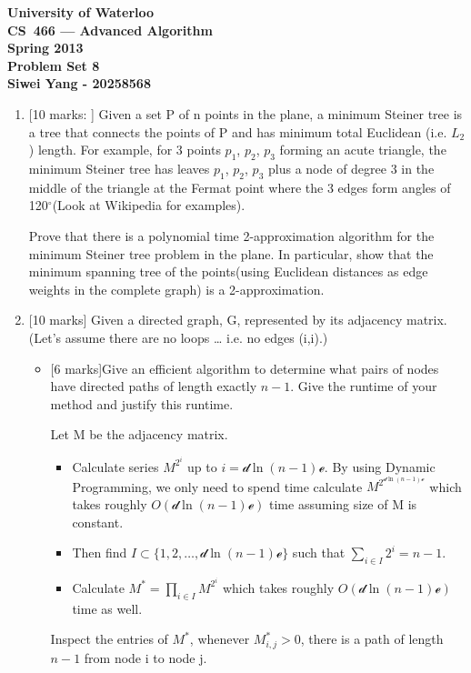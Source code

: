\documentclass[12pt]{article}
\begin{document}
\begin{center}
\large\bf University of Waterloo\\
CS~466 --- Advanced Algorithm\\
Spring 2013\\
Problem Set 8\\
Siwei Yang - 20258568\\
\end{center}
\bigskip

\begin{enumerate}

\item{} [10 marks: ]
Given a set P of n points in the plane, a minimum Steiner tree is a tree that connects the points of P and has minimum total Euclidean (i.e. $L_{2}$) length. For example, for 3 points $p_{1}$, $p_{2}$, $p_{3}$ forming an acute triangle, the minimum Steiner tree has leaves $p_{1}$, $p_{2}$, $p_{3}$ plus a node of degree 3 in the middle of the triangle at the Fermat point where the 3 edges form angles of 120$^\circ$(Look at Wikipedia for examples).

Prove that there is a polynomial time 2-approximation algorithm for the minimum Steiner tree problem in the plane. In particular, show that the minimum spanning tree of the points(using Euclidean distances as edge weights in the complete graph) is a 2-approximation.



\item{} [10 marks]
Given a directed graph, G, represented by its adjacency matrix. (Let’s assume there are no loops … i.e. no edges (i,i).)
\begin{itemize}
\item{}[6 marks]Give an efficient algorithm to determine what pairs of nodes have directed paths of length exactly $n-1$. Give the runtime of your method and justify this runtime.

Let M be the adjacency matrix.
\begin{itemize}
\item Calculate series $M^{2^{i}}$ up to $i = \mathcal{d} \ln{(n-1)} \mathcal{e}$. By using Dynamic Programming, we only need to spend time calculate $M^{2^{\mathcal{d} \ln{(n-1)} \mathcal{e}}}$ which takes roughly $O(\mathcal{d} \ln{(n-1)} \mathcal{e})$ time assuming size of M is constant.
\item Then find $I \subset \{1, 2, \ldots, \mathcal{d} \ln{(n-1)} \mathcal{e}\}$ such that $\sum_{i \in I}{2^{i}} = n-1$.
\item Calculate $M^{*} = \prod_{i \in I}{M^{2^{i}}}$ which takes roughly $O(\mathcal{d} \ln{(n-1)} \mathcal{e})$ time as well.
\end{itemize}
 Inspect the entries of $M^{*}$, whenever $M^{*}_{i,j} > 0$, there is a path of length $n-1$ from node i to node j.


\end{itemize}
\end{enumerate}
\end{document}
